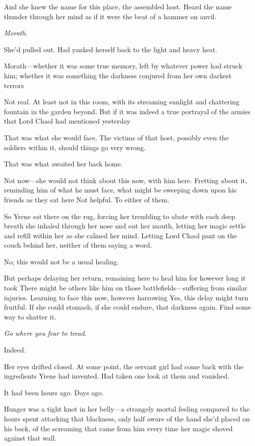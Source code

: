 And she knew the name for this place, the assembled host. Heard the name thunder through her mind as if it were the beat of a hammer on anvil.

\emph{Morath.}

She'd pulled out. Had yanked herself back to the light and heavy heat.

Morath---whether it was some true memory, left by whatever power had struck him; whether it was something the darkness conjured from her own darkest terrors 

Not real. At least not in this room, with its streaming sunlight and chattering fountain in the garden beyond. But if it was indeed a true portrayal of the armies that Lord Chaol had mentioned yesterday 

That was what she would face. The victims of that host, possibly even the soldiers within it, should things go very wrong.

That was what awaited her back home.

Not now---she would not think about this now, with him here. Fretting about it, reminding him of what he must face, what might be sweeping down upon his friends as they sat here  Not helpful. To either of them.

So Yrene sat there on the rug, forcing her trembling to abate with each deep breath she inhaled through her nose and out her mouth, letting her magic settle and refill within her as she calmed her mind. Letting Lord Chaol pant on the couch behind her, neither of them saying a word.

No, this would not be a usual healing.

But perhaps delaying her return, remaining here to heal him for however long it took  There might be others like him on those battlefields---suffering from similar injuries. Learning to face this now, however harrowing  Yes, this delay might turn fruitful. If she could stomach, if she could endure, that darkness again. Find some way to shatter it.

\emph{Go where you fear to tread.}

Indeed.

Her eyes drifted closed. At some point, the servant girl had come back with the ingredients Yrene had invented. Had taken one look at them and vanished.

It had been hours ago. Days ago.

Hunger was a tight knot in her belly---a strangely mortal feeling compared to the hours spent attacking that blackness, only half aware of the hand she'd placed on his back, of the screaming that came from him every time her magic shoved against that wall.

